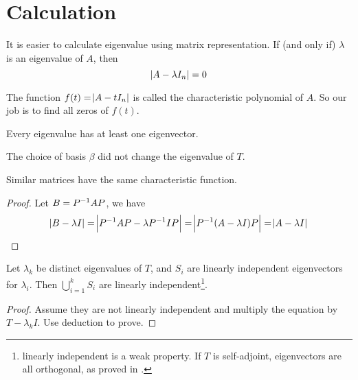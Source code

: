 \section{Calculation}

\begin{definition}
    It is easier to calculate eigenvalue using matrix representation. If (and only if) $\lambda$ is an eigenvalue of $A$, then 
\begin{equation}
    \abs{A - \lambda I_n} = 0
\end{equation}

The function $f(t) = \abs{A - t I_n}$ is called the characteristic polynomial of $A$. So our job is to find all zeros of $f(t)$.
\end{definition}



\begin{theorem}
    Every eigenvalue has at least one eigenvector.    
\end{theorem}


\begin{theorem}
    The choice of basis $\beta$ did not change the eigenvalue of $T$.
\end{theorem}

\begin{theorem}
Similar matrices have the same characteristic function.    
\end{theorem}

\begin{proof}
    Let $B = {P}^{-1}AP$, we have 
    \begin{equation}
        \abs{B - \lambda I} = \abs{{P}^{-1} A P - \lambda {P}^{-1} I P} = \abs{{P}^{-1} (A - \lambda I) P} = \abs{A - \lambda I}
    \end{equation}
\end{proof}


\begin{theorem}\label{eigenvector_sets_are_linearly_independent}
    Let $\lambda_k$ be distinct eigenvalues of $T$, and $S_i$ are linearly independent eigenvectors for $\lambda_i$. Then $\bigcup_{i=1}^k S_i$ are linearly independent\footnote{linearly independent is a weak property. If $T$ is self-adjoint, eigenvectors are all orthogonal, as proved in .}.
\end{theorem}
\begin{proof}
    Assume they are not linearly independent and multiply the equation by $T - \lambda_k I$. Use deduction to prove.
\end{proof}

